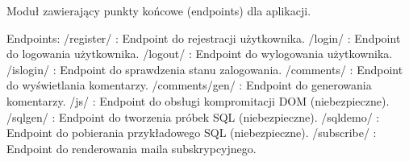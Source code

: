 \documentclass[letterpaper,11pt,polish]{sphinxmanual}
\begin{document}
\begin{fulllineitems}
\label{\detokenize{mainApp:mainApp.urls.urlpatterns}}
\pysigstartsignatures
{}
\pysigstopsignatures
\sphinxAtStartPar
Moduł zawierający punkty końcowe (endpoints) dla aplikacji.

\sphinxAtStartPar
Endpoints:
\sphinxhyphen{} /register/ : Endpoint do rejestracji użytkownika.
\sphinxhyphen{} /login/ : Endpoint do logowania użytkownika.
\sphinxhyphen{} /logout/ : Endpoint do wylogowania użytkownika.
\sphinxhyphen{} /islogin/ : Endpoint do sprawdzenia stanu zalogowania.
\sphinxhyphen{} /comments/ : Endpoint do wyświetlania komentarzy.
\sphinxhyphen{} /comments/gen/ : Endpoint do generowania komentarzy.
\sphinxhyphen{} /js/ : Endpoint do obsługi kompromitacji DOM (niebezpieczne).
\sphinxhyphen{} /sqlgen/ : Endpoint do tworzenia próbek SQL (niebezpieczne).
\sphinxhyphen{} /sqldemo/ : Endpoint do pobierania przykładowego SQL (niebezpieczne).
\sphinxhyphen{} /subscribe/ : Endpoint do renderowania maila subskrypcyjnego.

\end{fulllineitems}
\end{document}
